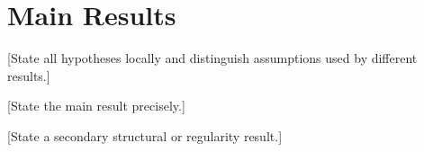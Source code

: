 \section{Main Results}
\label{sec:main-results}

[State all hypotheses locally and distinguish assumptions used by different
results.]

\begin{theorem}
\label{thm:main}
[State the main result precisely.]
\end{theorem}

\begin{proposition}
\label{prop:secondary}
[State a secondary structural or regularity result.]
\end{proposition}

\begin{remark}
\end{remark}
